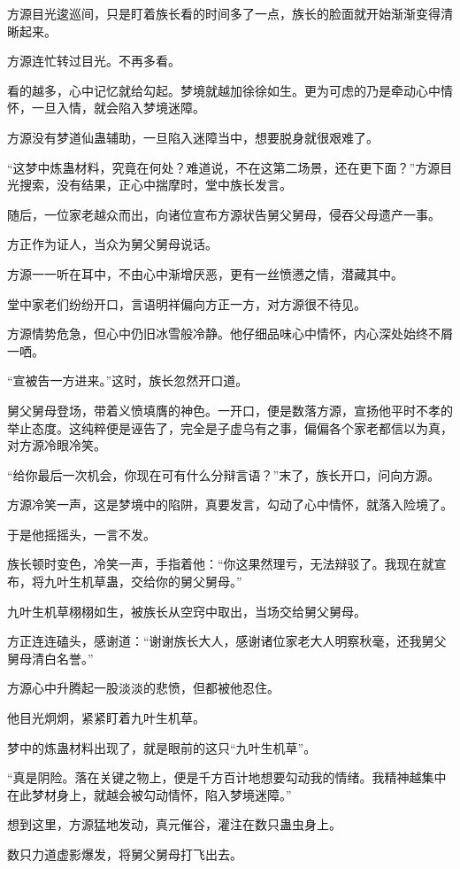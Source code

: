 \begin{this_body}
方源目光逡巡间，只是盯着族长看的时间多了一点，族长的脸面就开始渐渐变得清晰起来。

方源连忙转过目光。不再多看。

看的越多，心中记忆就给勾起。梦境就越加徐徐如生。更为可虑的乃是牵动心中情怀，一旦入情，就会陷入梦境迷障。

方源没有梦道仙蛊辅助，一旦陷入迷障当中，想要脱身就很艰难了。

“这梦中炼蛊材料，究竟在何处？难道说，不在这第二场景，还在更下面？”方源目光搜索，没有结果，正心中揣摩时，堂中族长发言。

随后，一位家老越众而出，向诸位宣布方源状告舅父舅母，侵吞父母遗产一事。

方正作为证人，当众为舅父舅母说话。

方源一一听在耳中，不由心中渐增厌恶，更有一丝愤懑之情，潜藏其中。

堂中家老们纷纷开口，言语明祥偏向方正一方，对方源很不待见。

方源情势危急，但心中仍旧冰雪般冷静。他仔细品味心中情怀，内心深处始终不屑一哂。

“宣被告一方进来。”这时，族长忽然开口道。

舅父舅母登场，带着义愤填膺的神色。一开口，便是数落方源，宣扬他平时不孝的举止态度。这纯粹便是诬告了，完全是子虚乌有之事，偏偏各个家老都信以为真，对方源冷眼冷笑。

“给你最后一次机会，你现在可有什么分辩言语？”末了，族长开口，问向方源。

方源冷笑一声，这是梦境中的陷阱，真要发言，勾动了心中情怀，就落入险境了。

于是他摇摇头，一言不发。

族长顿时变色，冷笑一声，手指着他：“你这果然理亏，无法辩驳了。我现在就宣布，将九叶生机草蛊，交给你的舅父舅母。”

九叶生机草栩栩如生，被族长从空窍中取出，当场交给舅父舅母。

方正连连磕头，感谢道：“谢谢族长大人，感谢诸位家老大人明察秋毫，还我舅父舅母清白名誉。”

方源心中升腾起一股淡淡的悲愤，但都被他忍住。

他目光炯炯，紧紧盯着九叶生机草。

梦中的炼蛊材料出现了，就是眼前的这只“九叶生机草”。

“真是阴险。落在关键之物上，便是千方百计地想要勾动我的情绪。我精神越集中在此梦材身上，就越会被勾动情怀，陷入梦境迷障。”

想到这里，方源猛地发动，真元催谷，灌注在数只蛊虫身上。

数只力道虚影爆发，将舅父舅母打飞出去。


\end{this_body}
